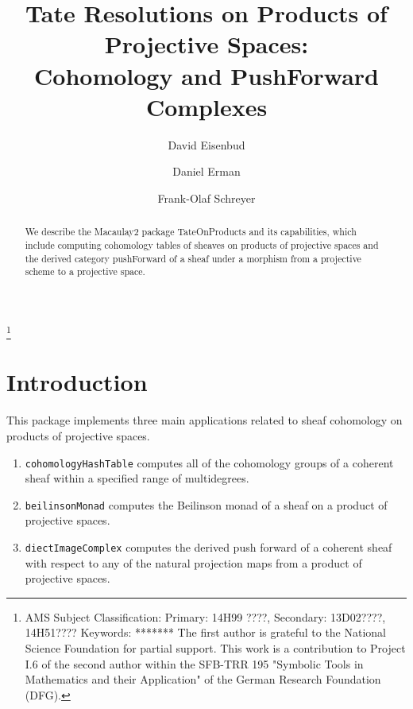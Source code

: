 \documentclass[twoside,12pt, leqno]{amsart}
\author[David Eisenbud]{David Eisenbud}
\author{Daniel Erman}
\author[Frank-Olaf Schreyer]{Frank-Olaf Schreyer}
\title[Tate Resolutions on Products of Projective Spaces]{Tate Resolutions on Products of Projective Spaces: \\ Cohomology and PushForward Complexes}
\begin{document}
\begin{abstract}
We describe the  Macaulay2 package TateOnProducts and its capabilities, which include computing cohomology tables of sheaves
on products of projective spaces and the derived category pushForward of a sheaf under a morphism from a projective scheme to a projective space.
\end{abstract}

\maketitle

\let\thefootnote\relax\footnote{
\noindent AMS Subject Classification:
Primary: 14H99 ????,
Secondary: 13D02????, 14H51???? \smallbreak
Keywords: *******\smallbreak
The first author is grateful to the
National Science Foundation for partial support. This work is a contribution to Project I.6 of the second author within the SFB-TRR 195 "Symbolic Tools in Mathematics and their Application" of the German Research Foundation (DFG).}


\section*{Introduction}
This package implements three main applications related to sheaf cohomology on products of projective spaces.
\begin{enumerate}
	\item  {\tt cohomologyHashTable} computes all of the cohomology groups of a coherent sheaf within a specified range of multidegrees.
	\item  {\tt beilinsonMonad} computes the Beilinson monad of a sheaf on a product of projective spaces.
	\item {\tt diectImageComplex} computes the derived push forward of a coherent sheaf with respect to any of the natural projection maps from a product of projective spaces.
\end{enumerate}
\end{document}
